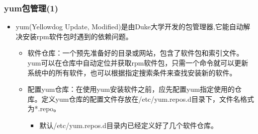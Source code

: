 \documentclass[xcolor=svgnames,presentation]{beamer}
\begin{document}
\begin{frame}
\frametitle{yum包管理(1)}
\label{sec-3-9}
\begin{itemize}

\item yum(Yellowdog Update, Modified)是由Duke大学开发的包管理器,它能自动解决安装rpm软件包时遇到的依赖问题。
\label{sec-3-9-1}%
\begin{itemize}

\item 软件仓库：一个预先准备好的目录或网站，包含了软件包和索引文件。yum可以在仓库中自动定位并获取rpm软件包，只需一个命令就可以更新系统中的所有软件，也可以根据指定搜索条件来查找安装新的软件。
\label{sec-3-9-1-1}%

\item 配置yum仓库：在使用yum安装软件之前，应先配置yum指定使用的仓库。定义yum仓库的配置文件存放在/etc/yum.repos.d目录下，文件名格式为*.repo。
\label{sec-3-9-1-2}%
\begin{itemize}

\item 默认/etc/yum.repos.d目录内已经定义好了几个软件仓库。
\label{sec-3-9-1-2-1}%
\end{itemize} %
\end{itemize} %
\end{itemize} %
\end{frame}
\end{document}
